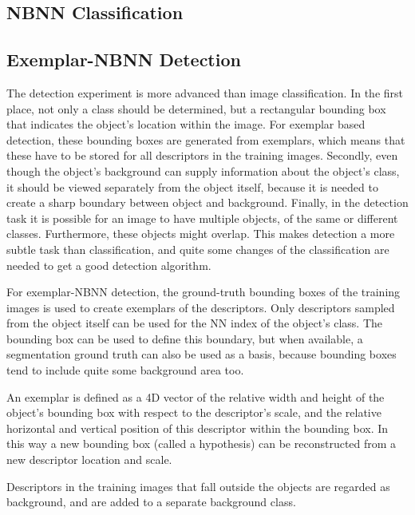 \subsection{NBNN Classification} %
\label{sec:nbnn-cls}


\subsection{Exemplar-NBNN Detection} %
\label{sec:nbnn_detection}
The detection experiment is more advanced than image classification. In the first place, not only a class should be determined, but a rectangular bounding box that indicates the object's location within the image. For exemplar based detection, these bounding boxes are generated from exemplars, which means that these have to be stored for all descriptors in the training images. Secondly, even though the object's background can supply information about the object's class, it should be viewed separately from the object itself, because it is needed to create a sharp boundary between object and background. Finally, in the detection task it is possible for an image to have multiple objects, of the same or different classes. Furthermore, these objects might overlap. This makes detection a more subtle task than classification, and quite some changes of the classification are needed to get a good detection algorithm.

For exemplar-NBNN detection, the ground-truth bounding boxes of the training images is used to create exemplars of the descriptors. Only descriptors sampled from the object itself can be used for the NN index of the object's class. The bounding box can be used to define this boundary, but when available, a segmentation ground truth can also be used as a basis, because bounding boxes tend to include quite some background area too. 

An exemplar is defined as a 4D vector of the relative width and height of the object's bounding box with respect to the descriptor's scale, and the relative horizontal and vertical position of this descriptor within the bounding box. In this way a new bounding box (called a hypothesis) can be reconstructed from a new descriptor location and scale.

Descriptors in the training images that fall outside the objects are regarded as background, and are added to a separate background class.

